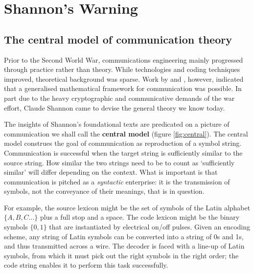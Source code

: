 
\section{Shannon's Warning}\label{sec:warning}

\subsection{The central model of communication theory}\label{subsec:central}

Prior to the Second World War, communications engineering mainly progressed through practice rather than theory.
While technologies and coding techniques improved, theoretical background was sparse.
Work by \citet{nyquist1924certain} and \citet{hartley1928transmission}, however, indicated that a generalised mathematical framework for communication was possible.
In part due to the heavy cryptographic and communicative demands of the war effort, Claude Shannon came to devise the general theory we know today.

The insights of Shannon's foundational texts \parencite*{shannon1948mathematicala,shannon1948mathematicalb} are predicated on a picture of communication we shall call the \textbf{central model} (figure \ref{fig:central}).
The central model construes the goal of communication as reproduction of a symbol string.
Communication is successful when the target string is sufficiently similar to the source string.
How similar the two strings need to be to count as `sufficiently similar' will differ depending on the context.
What is important is that communication is pitched as a \textit{syntactic} enterprise: it is the transmission of symbols, not the conveyance of their meanings, that is in question.



For example, the source lexicon might be the set of symbols of the Latin alphabet $\{A,B,C...\}$ plus a full stop and a space.
The code lexicon might be the binary symbols $\{0,1\}$ that are instantiated by electrical on/off pulses.
Given an encoding scheme, any string of Latin symbols can be converted into a string of 0s and 1s, and thus transmitted across a wire.
The decoder is faced with a line-up of Latin symbols, from which it must pick out the right symbols in the right order; the code string enables it to perform this task successfully.


